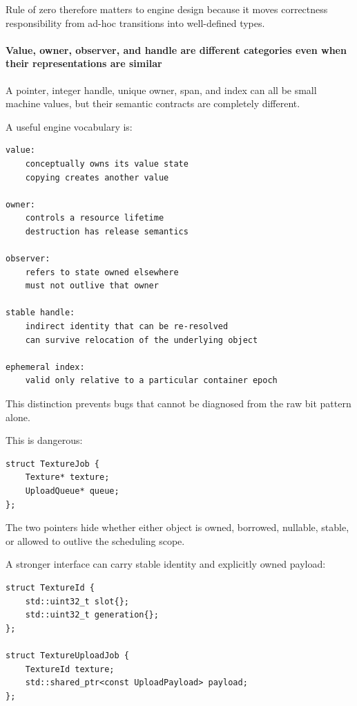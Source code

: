 Rule of zero therefore matters to engine design because it moves correctness responsibility from ad-hoc transitions into well-defined types.

\paragraph{Value, owner, observer, and handle are different categories even when their representations are similar}\label{value-owner-observer-and-handle-are-different-categories-even-when-their-representations-are-similar}

A pointer, integer handle, unique owner, span, and index can all be small machine values, but their semantic contracts are completely different.

A useful engine vocabulary is:

\begin{verbatim}
value:
    conceptually owns its value state
    copying creates another value

owner:
    controls a resource lifetime
    destruction has release semantics

observer:
    refers to state owned elsewhere
    must not outlive that owner

stable handle:
    indirect identity that can be re-resolved
    can survive relocation of the underlying object

ephemeral index:
    valid only relative to a particular container epoch
\end{verbatim}

This distinction prevents bugs that cannot be diagnosed from the raw bit pattern alone.

This is dangerous:

\begin{verbatim}
struct TextureJob {
    Texture* texture;
    UploadQueue* queue;
};
\end{verbatim}

The two pointers hide whether either object is owned, borrowed, nullable, stable, or allowed to outlive the scheduling scope.

A stronger interface can carry stable identity and explicitly owned payload:

\begin{verbatim}
struct TextureId {
    std::uint32_t slot{};
    std::uint32_t generation{};
};

struct TextureUploadJob {
    TextureId texture;
    std::shared_ptr<const UploadPayload> payload;
};
\end{verbatim}

